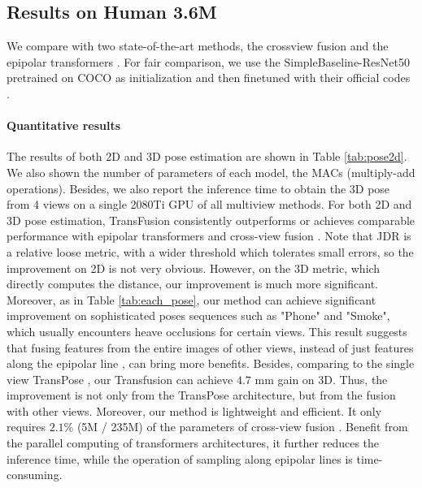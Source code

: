 \documentclass{bmvc2k}
\begin{document}
\vspace{-0.7em}
\subsection{Results on Human 3.6M}
\vspace{-0.7em}
We compare with two state-of-the-art methods, the crossview fusion \cite{qiu2019cross} and the epipolar transformers \cite{he2020epipolar}. For fair comparison, we use the SimpleBaseline-ResNet50 pretrained on COCO \cite{xiao2018simple} as initialization and then finetuned with their official codes \cite{qiu2019cross, he2020epipolar}. 



\vspace{-0.5em}
\paragraph{Quantitative results } 
The results of both 2D and 3D pose estimation are shown in Table \ref{tab:pose2d}. 
We also shown the number of parameters of each model, the MACs (multiply-add operations).
Besides, we also report the inference time to obtain the 3D pose from 4 views on a single 2080Ti GPU of all multiview methods. 
For both 2D and 3D pose estimation, TransFusion consistently outperforms or achieves comparable performance with epipolar transformers \cite{he2020epipolar} and cross-view fusion \cite{qiu2019cross}. 
Note that JDR is a relative loose metric, with a wider threshold which tolerates small errors, so the improvement on 2D is not very obvious. However, on the 3D metric, which directly computes the distance, our improvement is much more significant. Moreover, as in Table \ref{tab:each_pose}, our method can achieve significant improvement on sophisticated poses sequences such as "Phone" and "Smoke", which usually encounters heave occlusions for certain views.  
This result suggests that fusing features from the entire images of other views, instead of just features along the epipolar line \cite{he2020epipolar}, can bring more benefits.  
Besides, comparing to the single view TransPose \cite{yang2020transpose}, our Transfusion can achieve $4.7$ mm gain on 3D. Thus, the improvement is not only from the TransPose architecture, but from the fusion with other views. 
Moreover, our method is lightweight and efficient. It only requires $2.1\%$ (5M / 235M) of the parameters of cross-view fusion \cite{qiu2019cross}. Benefit from the parallel computing of transformers architectures, it further reduces the inference time, while the operation of sampling along epipolar lines \cite{he2020epipolar} is time-consuming. 
\end{document}
